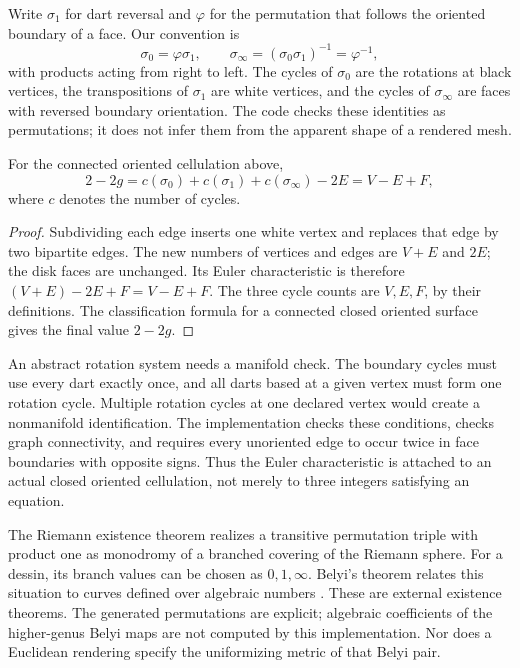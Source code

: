 Write $\sigma_1$ for dart reversal and $\varphi$ for the permutation that
follows the oriented boundary of a face.  Our convention is
\[
 \sigma_0=\varphi\sigma_1,\qquad
 \sigma_\infty=(\sigma_0\sigma_1)^{-1}=\varphi^{-1},
\]
with products acting from right to left.  The cycles of $\sigma_0$ are
the rotations at black vertices, the transpositions of $\sigma_1$ are
white vertices, and the cycles of $\sigma_\infty$ are faces with reversed
boundary orientation.  The code checks these identities as permutations;
it does not infer them from the apparent shape of a rendered mesh.

\begin{proposition}
For the connected oriented cellulation above,
\[
 2-2g=c(\sigma_0)+c(\sigma_1)+c(\sigma_\infty)-2E
      =V-E+F,
\]
where $c$ denotes the number of cycles.
\end{proposition}
\begin{proof}
Subdividing each edge inserts one white vertex and replaces that edge by
two bipartite edges.  The new numbers of vertices and edges are $V+E$ and
$2E$; the disk faces are unchanged.  Its Euler characteristic is therefore
$(V+E)-2E+F=V-E+F$.  The three cycle counts are $V,E,F$, by their
definitions.  The classification formula for a connected closed oriented
surface gives the final value $2-2g$.
\end{proof}

An abstract rotation system needs a manifold check.  The boundary cycles
must use every dart exactly once, and all darts based at a given vertex
must form one rotation cycle.  Multiple rotation cycles at one declared
vertex would create a nonmanifold identification.  The implementation
checks these conditions, checks graph connectivity, and requires every
unoriented edge to occur twice in face boundaries with opposite signs.
Thus the Euler characteristic is attached to an actual closed oriented
cellulation, not merely to three integers satisfying an equation.

The Riemann existence theorem realizes a transitive permutation triple
with product one as monodromy of a branched covering of the Riemann sphere.
For a dessin, its branch values can be chosen as $0,1,\infty$.  Belyi's
theorem relates this situation to curves defined over algebraic numbers
\cite{QSBelyi1980}.  These are external existence theorems.  The generated
permutations are explicit; algebraic coefficients of the higher-genus
Belyi maps are not computed by this implementation.  Nor does a Euclidean
rendering specify the uniformizing metric of that Belyi pair.

